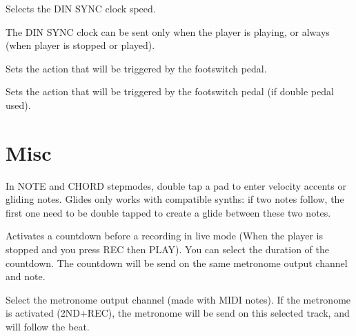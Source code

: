           

Selects the DIN SYNC clock speed.

  

The DIN SYNC clock can be sent only when the player is playing, or always (when player is stopped or played).

   

Sets the action that will be triggered by the footswitch pedal.

   

Sets the action that will be triggered by the footswitch pedal (if double pedal used).


\section{Misc}

  

In NOTE and CHORD stepmodes, double tap a pad to enter velocity accents or gliding notes. Glides only works with compatible synths: if two notes follow, the first one need to be double tapped to create a glide between these two notes.

     

Activates a countdown before a recording in live mode (When the player is stopped and you press REC then PLAY). You can select the duration of the countdown. The countdown will be send on the same metronome output channel and note.

    \settingopt{\ldots} 

Select the metronome output channel (made with MIDI notes). If the metronome is activated (2ND+REC), the metronome will be send on this selected track, and will follow the beat.

  

